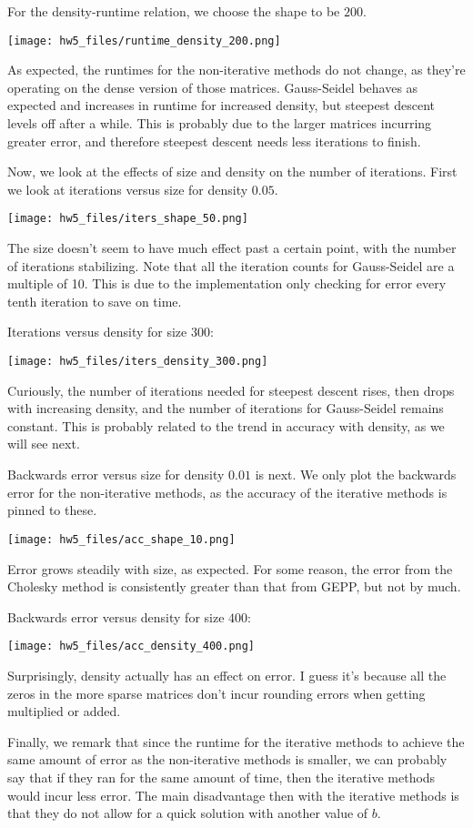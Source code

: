 \documentclass{article}
\begin{document}
For the density-runtime relation, we choose the shape to be $200$.

\texttt{[image: hw5\_files/runtime\_density\_200.png]}

As expected, the runtimes for the non-iterative methods do not change, as they're operating on the dense version of those matrices. Gauss-Seidel behaves as expected and increases in runtime for increased density, but steepest descent levels off after a while. This is probably due to the larger matrices incurring greater error, and therefore steepest descent needs less iterations to finish.

Now, we look at the effects of size and density on the number of iterations. First we look at iterations versus size for density $0.05$.

\texttt{[image: hw5\_files/iters\_shape\_50.png]}

The size doesn't seem to have much effect past a certain point, with the number of iterations stabilizing. Note that all the iteration counts for Gauss-Seidel are a multiple of 10. This is due to the implementation only checking for error every tenth iteration to save on time.

Iterations versus density for size $300$:

\texttt{[image: hw5\_files/iters\_density\_300.png]}

Curiously, the number of iterations needed for steepest descent rises, then drops with increasing density, and the number of iterations for Gauss-Seidel remains constant. This is probably related to the trend in accuracy with density, as we will see next.

Backwards error versus size for density $0.01$ is next. We only plot the backwards error for the non-iterative methods, as the accuracy of the iterative methods is pinned to these.

\texttt{[image: hw5\_files/acc\_shape\_10.png]}

Error grows steadily with size, as expected. For some reason, the error from the Cholesky method is consistently greater than that from GEPP, but not by much. 

Backwards error versus density for size $400$:

\texttt{[image: hw5\_files/acc\_density\_400.png]}

Surprisingly, density actually has an effect on error. I guess it's because all the zeros in the more sparse matrices don't incur rounding errors when getting multiplied or added.

Finally, we remark that since the runtime for the iterative methods to achieve the same amount of error as the non-iterative methods is smaller, we can probably say that if they ran for the same amount of time, then the iterative methods would incur less error. The main disadvantage then with the iterative methods is that they do not allow for a quick solution with another value of $b$.
\end{document}
